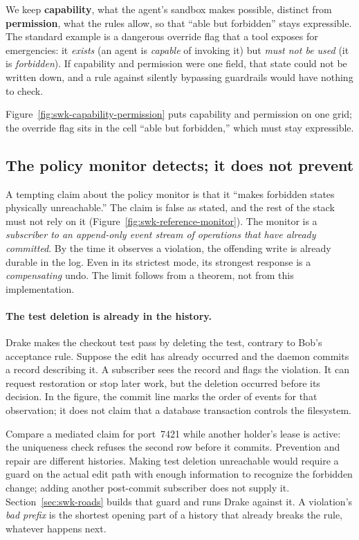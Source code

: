 \documentclass[11pt,a4paper]{article}
\theoremstyle{definition}
\theoremstyle{remark}
\begin{document}
We keep \textbf{capability}, what the agent's sandbox makes possible, distinct
from \textbf{permission}, what the rules allow, so that ``able but forbidden''
stays expressible. The standard example is a dangerous override flag that a
tool exposes for emergencies: it \emph{exists} (an agent is \emph{capable} of
invoking it) but \emph{must not be used} (it is \emph{forbidden}). If capability
and permission were one field, that state could not be written down, and a rule
against silently bypassing guardrails would have nothing to check.



Figure~\ref{fig:swk-capability-permission} puts capability and permission on
one grid; the override flag sits in the cell ``able but forbidden,'' which must
stay expressible.

\subsection{The policy monitor detects; it does not prevent}
\label{sec:arbiter-correction}



A tempting claim about the policy monitor is that it ``makes forbidden states
physically unreachable.'' The claim is false as stated, and the rest of the
stack must not rely on it (Figure~\ref{fig:swk-reference-monitor}). The monitor
is a \emph{subscriber to an append-only event stream of operations that have
already committed}. By the time it observes a violation, the offending write is
already durable in the log. Even in its strictest mode, its strongest response
is a \emph{compensating} undo. The limit follows from a theorem, not from this
implementation.

\paragraph{The test deletion is already in the history.}
Drake makes the checkout test pass by deleting the test, contrary to Bob's
acceptance rule. Suppose the edit has already occurred and the daemon commits
a record describing it. A subscriber sees the record and flags the violation.
It can request restoration or stop later work, but the deletion occurred
before its decision. In the figure, the commit line marks the order of events
for that observation; it does not claim that a database transaction controls
the filesystem.

Compare a mediated claim for port~7421 while another holder's lease is active:
the uniqueness check refuses the second row before it commits. Prevention and
repair are different histories. Making test deletion unreachable would require
a guard on the actual edit path with enough information to recognize the
forbidden change; adding another post-commit subscriber does not supply it.
Section~\ref{sec:swk-roads} builds that guard and runs Drake against it.
A violation's \emph{bad prefix} is the shortest opening part of a history that
already breaks the rule, whatever happens next.
\end{document}
